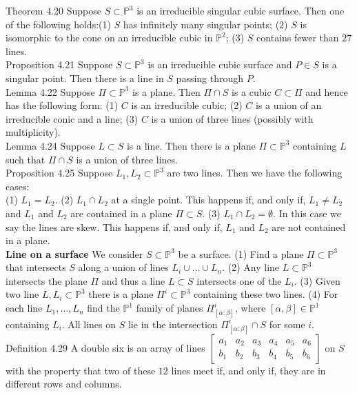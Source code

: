 \documentclass[8pt]{extarticle}
\begin{document}
Theorem 4.20 Suppose $S \subset \mathbb{P}^3$ is an irreducible singular cubic surface. Then one of the following holds:(1) $S$ has infinitely many singular points; (2) $S$ is isomorphic to the cone on an irreducible cubic in $\mathbb{P}^2$; (3) $S$ contains fewer than $27$ lines.\\
Proposition 4.21 Suppose $S \subset \mathbb{P}^3$ is an irreducible cubic surface and $P \in S$ is a singular point. Then there is a line in $S$ passing through $P.$\\
Lemma 4.22 Suppose $\Pi \subset \mathbb{P}^3$ is a plane. Then $\Pi \cap S$ is a cubic $C \subset \Pi$ and hence has the following form: (1) $C$ is an irreducible cubic; (2) $C$ is a union of an irreducible conic and a line; (3) $C$ is a union of three lines (possibly with multiplicity).\\
Lemma 4.24 Suppose $L \subset S$ is a line. Then there is a plane $\Pi \subset \mathbb{P}^3$ containing $L$ such that $\Pi\cap S$ is a union of three lines.\\
Proposition 4.25 Suppose $L_1, L_2 \subset \mathbb{P}^3$ are two lines. Then we have the following cases:\\
(1) $L_1 = L_2.$
(2) $L_1 \cap L_2$ at a single point. This happens if, and only if, $L_1 \neq L_2$ and $L_1$ and $L_2$ are contained in a
plane $\Pi \subset S.$
(3) $L_1 \cap L_2 = \emptyset.$ In this case we say the lines are skew. This happens if, and only if, $L_1$ and $L_2$ are
not contained in a plane.\\
\textbf{Line on a surface} We consider $S \subset \mathbb{P}^3$ be a surface. (1) Find a plane $\Pi \subset \mathbb{P}^3$ that intersects $S$ along a union of lines $L_i \cup \dots \cup L_n$. (2) Any line $L \subset \mathbb{P}^3$ intersects the plane $\Pi$ and thus a line $L \subset S$ intersects one of the $L_i$. (3) Given two line $L, L_i \subset \mathbb{P}^3$ there is a plane $\Pi^i \subset \mathbb{P}^3$ containing these two lines. (4) For each line $L_1, \dots, L_n$ find the $\mathbb{P}^1$ family of planes $\Pi_{[\alpha:\beta]}^i$, where $[\alpha, \beta] \in \mathbb{P}^1$ containing $L_i$. All lines on $S$ lie in the intersection $\Pi_{[\alpha:\beta]}^i \cap S$ for some $i$. \\  
Definition 4.29 A double six is an array of lines $\begin{bmatrix}
a_1 & a_2 & a_3 & a_4 & a_5 & a_6\\
b_1 & b_2 & b_3 & b_4 & b_5 & b_6\end{bmatrix}$
on $S$ with the property that two of these $12$ lines meet if, and only if, they are in different rows and columns.\\
\end{document}
